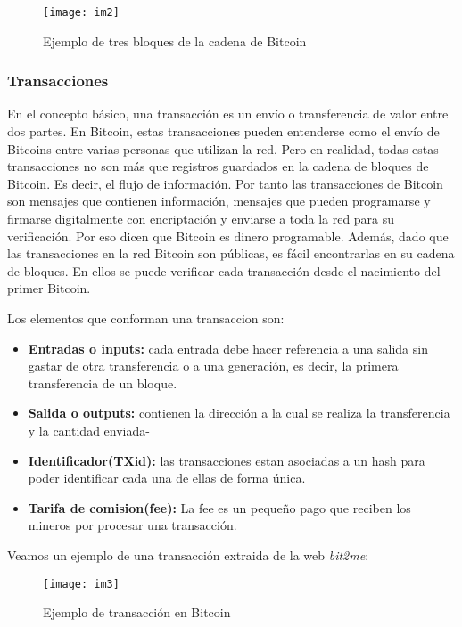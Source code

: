 \documentclass[11pt]{article} %
\begin{document}
\begin{center}
	\begin{figure}
		\centering
		\texttt{[image: im2]}
		\caption{Ejemplo de tres bloques de la cadena de Bitcoin}
	\end{figure}
\end{center}


\subsubsection{Transacciones}

En el concepto básico, una transacción es un envío o transferencia de valor entre dos partes. En Bitcoin, estas transacciones pueden entenderse como el envío de Bitcoins entre varias personas que utilizan la red. Pero en realidad, todas estas transacciones no son más que registros guardados en la cadena de bloques de Bitcoin. Es decir, el flujo de información. Por tanto las transacciones de Bitcoin son mensajes que contienen información, mensajes que pueden programarse y firmarse digitalmente con encriptación y enviarse a toda la red para su verificación. Por eso dicen que Bitcoin es dinero programable. Además, dado que las transacciones en la red Bitcoin son públicas, es fácil encontrarlas en su cadena de bloques. En ellos se puede verificar cada transacción desde el nacimiento del primer Bitcoin.

Los elementos que conforman una transaccion son:

\begin{itemize}
	\item \textbf{Entradas o inputs:} cada entrada debe hacer referencia a una salida sin gastar de otra transferencia o a una generación, es decir, la primera transferencia de un bloque.
	\item \textbf{Salida o outputs:} contienen la dirección a la cual se realiza la transferencia y la cantidad enviada-
	\item \textbf{Identificador(TXid):} las transacciones estan asociadas a un hash para poder identificar cada una de ellas de forma única.
	\item \textbf{Tarifa de comision(fee):} La fee es un pequeño pago que reciben los mineros por procesar una transacción.
\end{itemize}

Veamos un ejemplo de una transacción extraida de la web \textit{bit2me}:

\begin{center}
	\begin{figure}[h!]
		\centering
		\texttt{[image: im3]}
		\caption{Ejemplo de transacción en Bitcoin}
	\end{figure}
\end{center}
\end{document}
